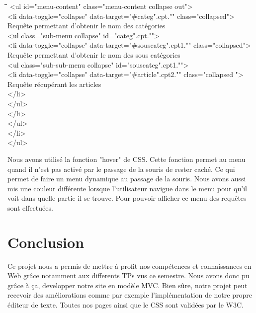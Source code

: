 \documentclass[hidelinks, 12pt,a4paper]{article}
\begin{document}
\begin{tabbing}
\hspace{0.5cm}\=\hspace{0.5cm}\=\hspace{0.5cm}\=\hspace{0.5cm}\=\hspace{0.5cm}\=\hspace{0.5cm}\=\kill
<ul id="menu-content" class="menu-content collapse out">\\
\><li data-toggle="collapse" data-target="\#categ".cpt."" class="collapsed">\\
\>\>Requête permettant d'obtenir le nom des catégories\\
\>\><ul class="sub-menu collapse" id="categ".cpt."">\\
\>\>\><li data-toggle="collapse" data-target="\#souscateg".cpt1."" class="collapsed">\\
\>\>\>\>Requête permettant d'obtenir le nom des sous catégories\\
\>\>\>\><ul class="sub-sub-menu collapse" id="souscateg".cpt1."">\\
\>\>\>\>\><li data-toggle="collapse" data-target="\#article".cpt2."" class="collapsed ">\\
\>\>\>\>\>\> Requête récupérant les articles\\
\>\>\>\>\></li>\\
\>\>\>\></ul>\\
\>\>\></li>\\
\>\></ul>\\
\></li>\\
</ul>\\
\end{tabbing} 

Nous avons utilisé la fonction "hover" de CSS. Cette fonction permet au menu quand il n'est pas activé par le passage de la souris de rester caché. Ce qui permet de faire un menu dynamique au passage de la souris. Nous avons aussi mis une couleur différente lorsque l'utilisateur navigue dans le menu pour qu'il voit dans quelle partie il se trouve.
Pour pouvoir afficher ce menu des requêtes sont effectuées.

\newpage
\section{Conclusion}
Ce projet nous a permis de mettre à profit nos compétences et connaissances en Web grâce notamment aux differents TPs vus ce semestre. Nous avons donc pu grâce à ça, developper notre site en modèle MVC. Bien sûre, notre projet peut recevoir des améliorations comme par exemple l'implémentation de notre propre éditeur de texte. Toutes nos pages ainsi que le CSS sont validées par le W3C.
\end{document}
